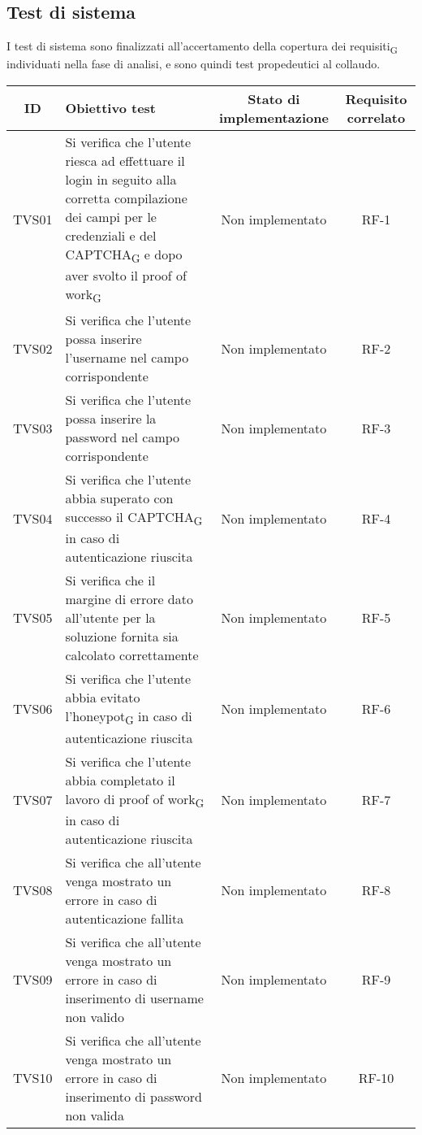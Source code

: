 \subsection{Test di sistema}
I test di sistema sono finalizzati all'accertamento della copertura dei requisiti\textsubscript{G} individuati nella fase di analisi, e sono quindi test propedeutici al collaudo.
\newpage
\begin{center}
	\setlength\extrarowheight{5pt}
	\begin{xltabular}{\textwidth}{|c|X|c|c|}
		\hline
		\textbf{ID} & \textbf{Obiettivo test} & \textbf{Stato di implementazione} & \textbf{Requisito correlato}\\
		\hline
		TVS01 & Si verifica che l’utente riesca ad effettuare
		il login in seguito alla corretta compilazione dei campi per le credenziali e del CAPTCHA\textsubscript{G} e dopo aver svolto il proof of work\textsubscript{G} & Non implementato & RF-1\\
		\hline
		TVS02 & Si verifica che l'utente possa inserire l'username nel campo corrispondente & Non implementato & RF-2\\
		\hline
		TVS03 & Si verifica che l'utente possa inserire la password nel campo corrispondente & Non implementato & RF-3\\
		\hline
		TVS04 & Si verifica che l'utente abbia superato con successo il CAPTCHA\textsubscript{G} in caso di autenticazione riuscita & Non implementato & RF-4\\
		\hline
		TVS05 & Si verifica che il margine di errore dato all'utente per la soluzione fornita sia calcolato correttamente & Non implementato & RF-5\\
		\hline
		TVS06 & Si verifica che l'utente abbia evitato l'honeypot\textsubscript{G} in caso di  autenticazione riuscita & Non implementato & RF-6\\
		\hline
		TVS07 & Si verifica che l'utente abbia completato il lavoro di proof of work\textsubscript{G} in caso di autenticazione riuscita & Non implementato & RF-7\\
		\hline
		TVS08 & Si verifica che all’utente venga mostrato un errore in caso di autenticazione fallita & Non implementato & RF-8\\
		\hline
		TVS09 & Si verifica che all’utente venga mostrato un errore in caso di inserimento di username non valido & Non implementato & RF-9\\
		\hline
		TVS10 & Si verifica che all’utente venga mostrato un errore in caso di inserimento di password non valida & Non implementato & RF-10\\

\end{xltabular}
\end{center}
